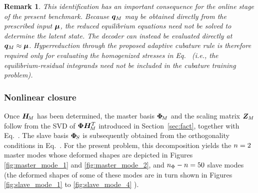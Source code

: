 \documentclass[preprint,10pt]{elsarticle}  %
\newtheorem{remark}{Remark}
\begin{document}
\begin{remark}
\label{remark:noiterations}
This identification has an important consequence for the online stage
of the present benchmark. Because \(\bm{q}_M\) may be obtained directly from the
prescribed input \(\bm{\mu}\), the reduced equilibrium equations
 need not be solved to determine the
latent state. The decoder can instead be evaluated directly at
\(\bm{q}_M\approx\bm{\mu}\). Hyperreduction through the proposed adaptive
cubature rule is therefore required only for evaluating the homogenized
stresses in Eq.~ (i.e., the equilibrium-residual integrands need not be included in
the cubature training problem).
\end{remark}

\subsubsection{Nonlinear closure}
\label{sec:nonlinearclosure}
%
Once \(\bm{H}_{\!M}\) has been determined, the master basis \(\bm{\Phi}_{\!M}\) and the
scaling matrix \(\bm{Z}_{M}\) follow from the SVD of
\(\bm{\Phi}\bm{H}_{\!M}^T\) introduced in Section~\ref{sec:fact}, together with
Eq.~. The slave basis \(\bm{\Phi}_{\!S}\) is subsequently
obtained from the orthogonality conditions in Eq.~. For
the present problem, this decomposition yields the $n = 2$ master modes whose deformed shapes are depicted in Figures \ref{fig:master_mode_1} and \ref{fig:master_mode_2}, and
\(n_{\Phi}-n=50\) slave modes (the deformed shapes of some of these modes are in turn shown in Figures \ref{fig:slave_mode_1} to \ref{fig:slave_mode_4} ).

%
\end{document}
